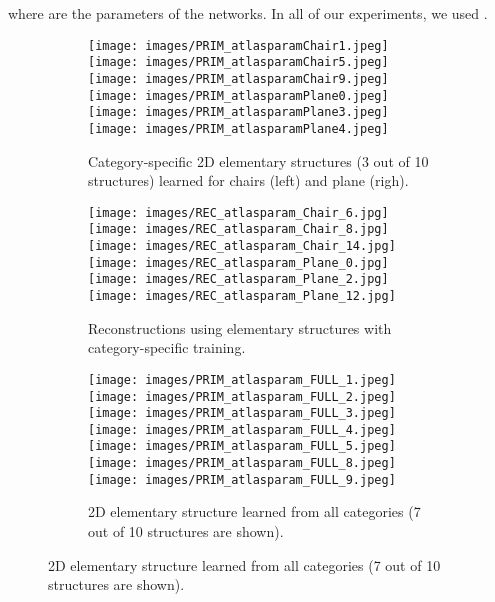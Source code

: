 \documentclass{article}
\begin{document}
where  are the parameters of the networks. In all of our experiments, we used .


\begin{figure}[t]
    \centering
    \begin{subfigure}{\textwidth}
        \centering
        \texttt{[image: images/PRIM\_atlasparamChair1.jpeg]}
        \texttt{[image: images/PRIM\_atlasparamChair5.jpeg]}
        \texttt{[image: images/PRIM\_atlasparamChair9.jpeg]}
        \vline
        \texttt{[image: images/PRIM\_atlasparamPlane0.jpeg]}
        \texttt{[image: images/PRIM\_atlasparamPlane3.jpeg]}
        \texttt{[image: images/PRIM\_atlasparamPlane4.jpeg]}
    \caption{Category-specific 2D elementary structures (3 out of 10 structures) learned for chairs (left) and plane (righ).}
        \label{fig:rec_resultsa}
    \end{subfigure}
    \begin{subfigure}{\textwidth}
        \centering
        \texttt{[image: images/REC\_atlasparam\_Chair\_6.jpg]}
        \texttt{[image: images/REC\_atlasparam\_Chair\_8.jpg]}
        \texttt{[image: images/REC\_atlasparam\_Chair\_14.jpg]}
        \vline
        \texttt{[image: images/REC\_atlasparam\_Plane\_0.jpg]}
        \texttt{[image: images/REC\_atlasparam\_Plane\_2.jpg]}
        \texttt{[image: images/REC\_atlasparam\_Plane\_12.jpg]}
    \caption{Reconstructions using elementary structures with category-specific training.}
        \label{fig:rec_resultsb}
    \end{subfigure}
    \begin{subfigure}{\textwidth}
        \centering
        \texttt{[image: images/PRIM\_atlasparam\_FULL\_1.jpeg]}
        \texttt{[image: images/PRIM\_atlasparam\_FULL\_2.jpeg]}
        \texttt{[image: images/PRIM\_atlasparam\_FULL\_3.jpeg]}
        \texttt{[image: images/PRIM\_atlasparam\_FULL\_4.jpeg]}
        \texttt{[image: images/PRIM\_atlasparam\_FULL\_5.jpeg]}
        \texttt{[image: images/PRIM\_atlasparam\_FULL\_8.jpeg]}
        \texttt{[image: images/PRIM\_atlasparam\_FULL\_9.jpeg]}
    \caption{2D elementary structure learned from all categories (7 out of 10 structures are shown).}
        \label{fig:rec_resultsc}
    \end{subfigure}

\end{figure}
\end{document}
